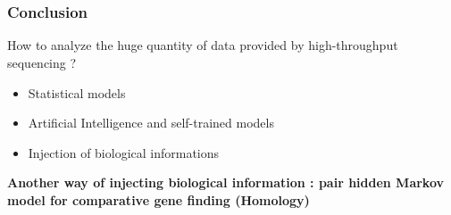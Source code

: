\documentclass{beamer}
\begin{document}
\section*{}
\begin{frame}
\frametitle{Conclusion}
How to analyze the huge quantity of data provided by high-throughput sequencing ? 

\begin{itemize}
		\item Statistical models
		\item Artificial Intelligence and self-trained models
		\item Injection of biological informations 
		 \end{itemize}
		 
		 \vspace{0.5 cm}
		 
		 \pause \begin{center}\textbf{Another way of injecting biological information : pair hidden Markov
model for comparative gene finding (Homology)}\end{center}
\end{frame}
\end{document}
